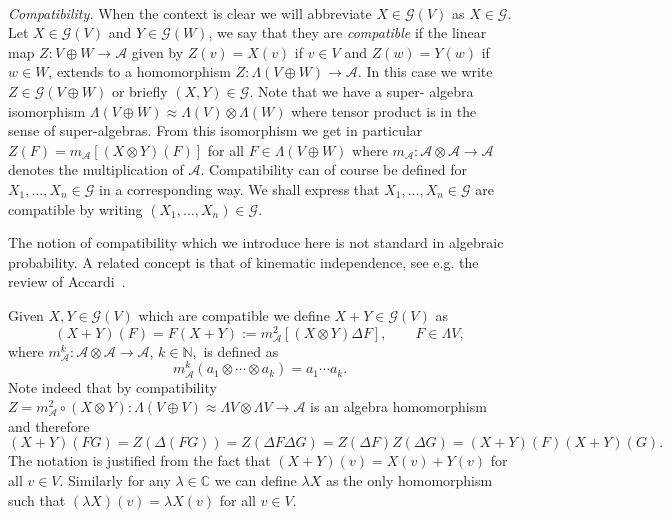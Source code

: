 \documentclass{article}
\newcommand{\assign}{:=}
\newcommand{\tmtextit}[1]{{\itshape{#1}}}
\begin{document}
\

\tmtextit{Compatibility.} When the context is clear we will abbreviate $X \in
\mathcal{G} (V)$ as $X \in \mathcal{G}$. Let $X \in \mathcal{G} (V)$ and $Y
\in \mathcal{G} (W)$, we say that they are \tmtextit{compatible} if the linear
map $Z : V \oplus W \rightarrow \mathcal{A}$ given by $Z (v) = X (v)$ if $v
\in V$ and $Z (w) = Y (w)$ if $w \in W$, extends to a homomorphism $Z :
\Lambda (V \oplus W) \rightarrow \mathcal{A}$. In this case we write $Z \in
\mathcal{G} (V \oplus W)$ or briefly $(X, Y) \in \mathcal{G}$. Note that we
have a super- algebra isomorphism $\Lambda (V \oplus W) \approx \Lambda (V)
\otimes \Lambda (W)$ where tensor product is in the sense of super-algebras.
From this isomorphism we get in particular $Z (F) = m_{\mathcal{A}} [(X
\otimes Y) (F)]$ for all $F \in \Lambda (V \oplus W)$ where $m_{\mathcal{A}} :
\mathcal{A} \otimes \mathcal{A} \rightarrow \mathcal{A}$ denotes the
multiplication of $\mathcal{A}$. Compatibility can of course be defined for
$X_1, \ldots, X_n \in \mathcal{G}$ in a corresponding way. We shall express
that $X_1, \ldots, X_n \in \mathcal{G}$ are compatible by writing $(X_1,
\ldots, X_n) \in \mathcal{G}$.

\begin{remark}
  The notion of compatibility which we introduce here is not standard in
  algebraic probability. A related concept is that of kinematic independence,
  see e.g. the review of Accardi~{\cite{accardi_outline_2015}}.
\end{remark}

Given $X, Y \in \mathcal{G} (V)$ which are compatible we define $X + Y \in
\mathcal{G} (V)$ as
\[ (X + Y) (F) = F (X + Y) \assign m_{\mathcal{A}}^2 [(X \otimes Y) \Delta F],
   \qquad F \in \Lambda V, \]
where $m_{\mathcal{A}}^k : \mathcal{A} \otimes \mathcal{A} \rightarrow
\mathcal{A}$, $k \in \mathbb{N},$ is defined as
\begin{equation}
  m_{\mathcal{A}}^k (a_1 \otimes \cdots \otimes a_k) = a_1 \cdots a_k
  \label{eq:productA} .
\end{equation}
Note indeed that by compatibility $Z = m_{\mathcal{A}}^2 \circ (X \otimes Y) :
\Lambda (V \oplus V) \approx \Lambda V \otimes \Lambda V \rightarrow
\mathcal{A}$ is an algebra homomorphism and therefore \
\[ (X + Y) (F G) = Z (\Delta (F G)) = Z (\Delta F \Delta G) = Z (\Delta F) Z
   (\Delta G) = (X + Y) (F) (X + Y) (G) . \]
The notation is justified from the fact that $(X + Y) (v) = X (v) + Y (v)$ for
all $v \in V$. Similarly for any $\lambda \in \mathbb{C}$ we can define
$\lambda X$ as the only homomorphism such that $(\lambda X) (v) = \lambda X
(v)$ for all $v \in V$.
\end{document}
